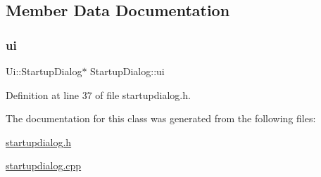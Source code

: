 \subsection{Member Data Documentation}
\mbox{\label{classStartupDialog_abd18126b373fe2249cfd15cd9cadce5b}} 
\subsubsection{\texorpdfstring{ui}{ui}}
{\footnotesize\ttfamily Ui\+::\+Startup\+Dialog$\ast$ Startup\+Dialog\+::ui\hspace{0.3cm}{\ttfamily [private]}}



Definition at line 37 of file startupdialog.\+h.



The documentation for this class was generated from the following files\+:\begin{DoxyCompactItemize}
\item 
\mbox{\hyperlink{startupdialog_8h}{startupdialog.\+h}}\item 
\mbox{\hyperlink{startupdialog_8cpp}{startupdialog.\+cpp}}\end{DoxyCompactItemize}
